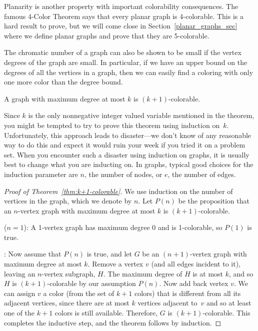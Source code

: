 Planarity is another property with important colorability consequences.
The famous 4-Color Theorem says that every planar graph is 4-colorable.
This is a hard result to prove, but we will come close in
Section~\ref{planar_graphs_sec} where we define planar graphs and prove
that they are 5-colorable.

The chromatic number of a graph can also be shown to be small if the
vertex degrees of the graph are small.  In particular, if we have an
upper bound on the degrees of all the vertices in a graph, then we can
easily find a coloring with only one more color than the degree bound.

\begin{theorem}\label{thm:k+1-colorable}
A graph with maximum degree at most $k$ is $(k+1)$-colorable.
\end{theorem}

Since $k$ is the only nonnegative integer valued variable mentioned in the
theorem, you might be tempted to try to prove this theorem using induction
on~$k$.  Unfortunately, this approach leads to disaster---we don't know of
any reasonable way to do this and expect it would ruin your week if you
tried it on a problem set.  When you encounter such a disaster using
induction on graphs, it is usually best to change what you are inducting
on.  In graphs, typical good choices for the induction parameter are $n$,
the number of nodes, or $e$, the number of edges.

\begin{proof}[Proof of Theorem~\ref{thm:k+1-colorable}]
We use induction on the number of vertices in the graph, which we
denote by $n$.  Let $P(n)$ be the proposition that an $n$-vertex graph
with maximum degree at most $k$ is $(k+1)$-colorable.

 ($n=1$): A 1-vertex graph has maximum degree
0 and is 1-colorable, so $P(1)$ is true.

: Now assume that $P(n)$ is true, and
let $G$ be an $(n+1)$-vertex graph with maximum degree at most $k$.
Remove a vertex $v$ (and all edges incident to it), leaving an
$n$-vertex subgraph, $H$.  The maximum degree of $H$ is at most $k$,
and so $H$ is $(k+1)$-colorable by our assumption $P(n)$.  Now add
back vertex $v$.  We can assign $v$ a color (from the set of $k + 1$
colors) that is different from all its adjacent vertices, since there
are at most $k$ vertices adjacent to~$v$ and so at least one of the
$k+1$ colors is still available.  Therefore, $G$ is $(k+1)$-colorable.
This completes the inductive step, and the theorem follows by
induction.
\end{proof}

